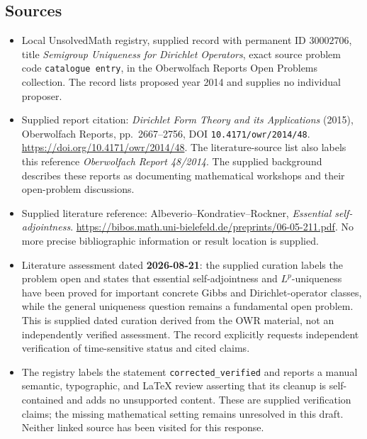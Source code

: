 \documentclass[11pt]{article}
\begin{document}
\subsection{Sources}
\begin{itemize}
\item Local UnsolvedMath registry, supplied record with permanent ID \(30002706\), title \emph{Semigroup Uniqueness for Dirichlet Operators}, exact source problem code \texttt{catalogue entry}, in the Oberwolfach Reports Open Problems collection. The record lists proposed year 2014 and supplies no individual proposer.
\item Supplied report citation: \emph{Dirichlet Form Theory and its Applications} (2015), Oberwolfach Reports, pp.~2667--2756, DOI \texttt{10.4171/owr/2014/48}. \url{https://doi.org/10.4171/owr/2014/48}. The literature-source list also labels this reference \emph{Oberwolfach Report 48/2014}. The supplied background describes these reports as documenting mathematical workshops and their open-problem discussions.
\item Supplied literature reference: Albeverio--Kondratiev--Rockner, \emph{Essential self-adjointness}. \url{https://bibos.math.uni-bielefeld.de/preprints/06-05-211.pdf}. No more precise bibliographic information or result location is supplied.
\item Literature assessment dated \textbf{2026-08-21}: the supplied curation labels the problem open and states that essential self-adjointness and \(L^p\)-uniqueness have been proved for important concrete Gibbs and Dirichlet-operator classes, while the general uniqueness question remains a fundamental open problem. This is supplied dated curation derived from the OWR material, not an independently verified assessment. The record explicitly requests independent verification of time-sensitive status and cited claims.
\item The registry labels the statement \texttt{corrected\_verified} and reports a manual semantic, typographic, and LaTeX review asserting that its cleanup is self-contained and adds no unsupported content. These are supplied verification claims; the missing mathematical setting remains unresolved in this draft. Neither linked source has been visited for this response.
\end{itemize}
\end{document}
